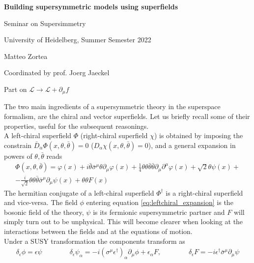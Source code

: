 \documentclass[12pt]{article}
\begin{document}

\centerline{\Large\bfseries Building supersymmetric models using superfields}
\vspace{5pt}
\centerline{\large Seminar on Supersimmetry}
\vspace{10pt}
\centerline{University of Heidelberg, Summer Semester 2022}
\vspace{5pt}
\centerline{Matteo Zortea}
\vspace{5pt}
\centerline{Coordinated by prof. Joerg Jaeckel}

\newpage
Part on $\mathcal{L} \to \mathcal{L} + \partial_\mu f$ \\
\raggedright The two main ingredients of a supersymmetric theory in the superspace formalism, are the chiral and vector superfields. Let us briefly recall some of their properties, useful for the subsequent reasonings. \\
\vspace{15pt}
A left-chiral superfield $\Phi$ (right-chiral superfield $\chi$) is obtained by imposing the constrain $\bar D_{\dot \alpha} \Phi(x, \theta, \bar\theta) = 0$  ($D_{\alpha} \chi(x, \theta, \bar\theta) = 0$), and a general expansion in powers of $\theta, \bar\theta$ reads
\begin{equation}
\begin{gathered}
  \Phi(x, \theta, \bar\theta) = \varphi(x) + i\bar\theta \bar\sigma^{\mu}\theta \partial_{\mu}\varphi(x) + \frac{1}{4}\theta\theta\bar\theta\bar\theta\partial_{\mu}\partial^{\mu}\varphi(x) + \sqrt{2}\theta\psi(x) + \\ 
                -\frac{i}{\sqrt{2}}\theta\theta\bar\theta\bar\sigma^{\mu}\partial_{\mu}\psi(x) + \theta\theta F(x)
\end{gathered}
\label{eq:leftchiral_expansion}
\end{equation}
The hermitian conjugate of a left-chiral superfield $\Phi^\dagger$ is a right-chiral superfield and vice-versa.
The field $\phi$ entering equation \ref{eq:leftchiral_expansion} is the bosonic field of the theory, $\psi$ is its fermionic supersymmetric partner and $F$ will simply turn out to be unphysical. This will become clearer when looking at the interactions between the fields and at the equations of motion. \\
Under a SUSY transformation the components transform as 
\begin{gather*}
  \delta_{\epsilon} \phi =\epsilon \psi \qquad\qquad
  \delta_{\epsilon} \psi_{\alpha} =-i\left(\sigma^{\mu} \epsilon^{\dagger}\right)_{\alpha} \partial_{\mu} \phi+\epsilon_{\alpha} F, \qquad\qquad
  \boxed{\delta_{\epsilon} F =-i \epsilon^{\dagger} \bar{\sigma}^{\mu} \partial_{\mu} \psi}
\end{gather*}
\end{document}
